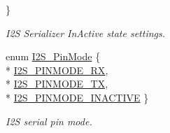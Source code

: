 \begin{DoxyCompactItemize}
 \}
\begin{DoxyCompactList}\small\item\em I2\+S Serializer In\+Active state settings. \end{DoxyCompactList}\item 
enum \hyperlink{_i2_s_8h_a68adf81f32430f87478afbc63e0623af}{I2\+S\+\_\+\+Pin\+Mode} \{ \\*
\hyperlink{_i2_s_8h_a68adf81f32430f87478afbc63e0623afa581622afe5daeecf01b66fb9c07c026b}{I2\+S\+\_\+\+P\+I\+N\+M\+O\+D\+E\+\_\+\+R\+X}, 
\\*
\hyperlink{_i2_s_8h_a68adf81f32430f87478afbc63e0623afa70c2a974a0b4fe247127546c4583cdfc}{I2\+S\+\_\+\+P\+I\+N\+M\+O\+D\+E\+\_\+\+T\+X}, 
\\*
\hyperlink{_i2_s_8h_a68adf81f32430f87478afbc63e0623aface52223cb7a46097543160547d9ff35d}{I2\+S\+\_\+\+P\+I\+N\+M\+O\+D\+E\+\_\+\+I\+N\+A\+C\+T\+I\+V\+E}
 \}
\begin{DoxyCompactList}\small\item\em I2\+S serial pin mode. \end{DoxyCompactList}\end{DoxyCompactItemize}
